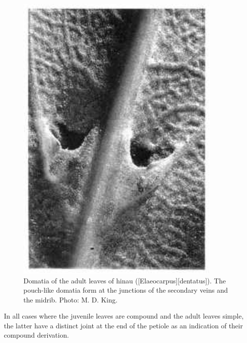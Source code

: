 \begin{figure}[htb]
\begin{minipage}[t]{0.498\textwidth}
    	\includegraphics[width=0.9\textwidth]{graphics/figure23hinau.jpg}
    	\caption[Domatia of the adult leaves of hinau]{Domatia of the adult leaves of hinau ([Elaeocarpus][dentatus]).
        The pouch-like domatia form at the junctions of the secondary veins and the midrib.
    	Photo: M. D. King.}%
    	\label{fig:23hinau}
	\end{minipage}
\end{figure}

In all cases where the juvenile leaves are compound and the adult leaves simple, the latter have a distinct joint at the end of the petiole as an indication of their compound derivation.

